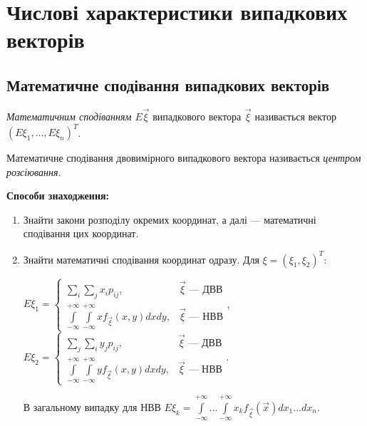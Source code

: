 \section{Числові характеристики випадкових векторів}

\subsection{Математичне сподівання випадкових векторів}
\begin{definition}
    \emph{Математичним сподіванням $E{\vec{\xi}}$} 
    випадкового вектора $\vec{\xi}$ називається вектор 
    $\left(E{\xi_1}, ..., E{\xi_n}\right)^T$.
\end{definition}
\begin{remark}
    Математичне сподівання двовимірного випадкового вектора 
    називається \emph{центром розсіювання}.
\end{remark}

\noindent \textbf{Способи знаходження:}
\begin{enumerate}
    \item Знайти закони розподілу окремих координат, а далі --- математичні сподівання цих координат.
    \item Знайти математичні сподівання координат одразу.
    Для $\xi = (\xi_1, \xi_2)^T$:
    
    $E\xi_1 = \begin{cases}
        \sum\limits_i \sum\limits_j x_i p_{ij}, & \vec{\xi} \text{ --- ДВВ} \\
        \int\limits_{-\infty}^{+\infty} \int\limits_{-\infty}^{+\infty} x f_{\vec{\xi}}(x,y) dx dy, & \vec{\xi} \text{ --- НВВ}
    \end{cases}$,
    $E\xi_2 = \begin{cases}
        \sum\limits_j \sum\limits_i y_j p_{ij}, & \vec{\xi} \text{ --- ДВВ} \\
        \int\limits_{-\infty}^{+\infty} \int\limits_{-\infty}^{+\infty} y f_{\vec{\xi}}(x,y) dx dy, & \vec{\xi} \text{ --- НВВ}
    \end{cases}$.
    
    В загальному випадку для НВВ $E\xi_k = \int\limits_{-\infty}^{+\infty}...\int\limits_{-\infty}^{+\infty} x_k f_{\vec{\xi}}(\vec{x}) dx_1 ... dx_n$.
\end{enumerate}

